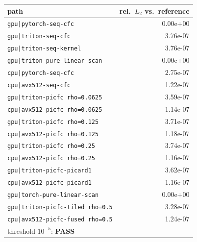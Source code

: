 \begin{tabular}{lr}
\toprule
path & rel.\ $L_2$ vs.\ reference \\
\midrule
\texttt{gpu|pytorch-seq-cfc} & 0.00e+00 \\
\texttt{gpu|triton-seq-cfc} & 3.76e-07 \\
\texttt{gpu|triton-seq-kernel} & 3.76e-07 \\
\texttt{gpu|triton-pure-linear-scan} & 0.00e+00 \\
\texttt{cpu|pytorch-seq-cfc} & 2.75e-07 \\
\texttt{cpu|avx512-seq-cfc} & 1.22e-07 \\
\texttt{gpu|triton-picfc rho=0.0625} & 3.59e-07 \\
\texttt{cpu|avx512-picfc rho=0.0625} & 1.14e-07 \\
\texttt{gpu|triton-picfc rho=0.125} & 3.71e-07 \\
\texttt{cpu|avx512-picfc rho=0.125} & 1.18e-07 \\
\texttt{gpu|triton-picfc rho=0.25} & 3.74e-07 \\
\texttt{cpu|avx512-picfc rho=0.25} & 1.16e-07 \\
\texttt{gpu|triton-picfc-picard1} & 3.62e-07 \\
\texttt{cpu|avx512-picfc-picard1} & 1.16e-07 \\
\texttt{gpu|torch-pure-linear-scan} & 0.00e+00 \\
\texttt{gpu|triton-picfc-tiled rho=0.5} & 3.28e-07 \\
\texttt{cpu|avx512-picfc-fused rho=0.5} & 1.24e-07 \\
\bottomrule
\multicolumn{2}{l}{threshold $10^{-5}$: \textbf{PASS}} \\
\end{tabular}
